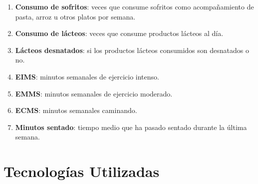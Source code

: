 \begin{enumerate}
    \item \textbf{Consumo de sofritos}: veces que consume sofritos como acompañamiento de pasta, arroz u otros platos por semana.
    \item \textbf{Consumo de lácteos}: veces que consume productos lácteos al día.
    \item \textbf{Lácteos desnatados}: si los productos lácteos consumidos son desnatados o no.
    \item \textbf{EIMS}: minutos semanales de ejercicio intenso.
    \item \textbf{EMMS}: minutos semanales de ejercicio moderado.
    \item \textbf{ECMS}: minutos semanales caminando.
    \item \textbf{Minutos sentado}: tiempo medio que ha pasado sentado durante la última semana.
\end{enumerate}



\section{Tecnologías Utilizadas}

